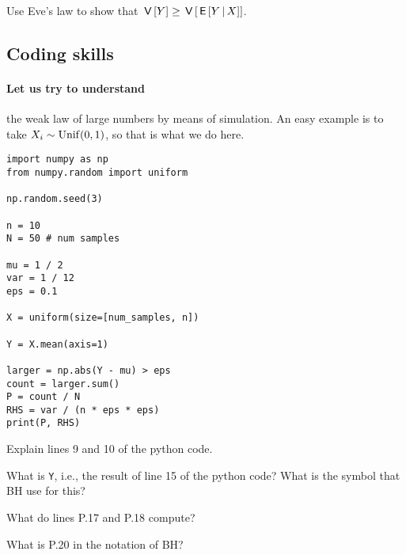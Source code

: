 \documentclass[assignments]{subfiles}
\begin{document}
\begin{exercise}
Use Eve's law to show that $\,\mathsf{V}\left[Y\right] \geq \,\mathsf{V}\left[\,\mathsf{E}\left[Y\,\middle|\, X\right]\right]$.
\end{exercise}

\subsection{Coding skills}

\paragraph{Let us try to understand} the weak law of large numbers by means of simulation. An easy example is to take $X_{i}\sim\mathrm{Unif}(0,1)$, so that is what we do here.

\begin{verbatim}
import numpy as np
from numpy.random import uniform

np.random.seed(3)

n = 10
N = 50 # num samples

mu = 1 / 2
var = 1 / 12
eps = 0.1

X = uniform(size=[num_samples, n])

Y = X.mean(axis=1)

larger = np.abs(Y - mu) > eps
count = larger.sum()
P = count / N
RHS = var / (n * eps * eps)
print(P, RHS)
\end{verbatim}

\begin{exercise}
Explain lines 9 and 10 of the python code.
\begin{solution}
\end{solution}
\end{exercise}

\begin{exercise}
What is \texttt{Y}, i.e., the result of line 15 of the python code? What is the symbol that BH use for this?
\begin{solution}
\end{solution}
\end{exercise}

\begin{exercise}
What do lines P.17 and P.18 compute?
\begin{solution}
\end{solution}
\end{exercise}

\begin{exercise}
What is P.20 in the notation of BH?
\begin{solution}
\end{solution}
\end{exercise}
\end{document}
